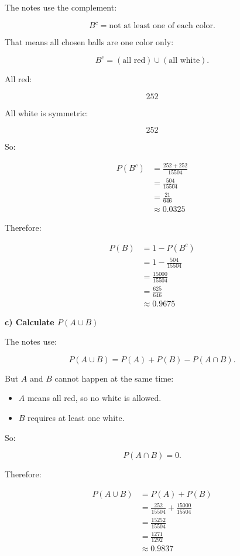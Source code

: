 \documentclass[10pt]{article}
\begin{document}
The notes use the complement:

\[
B^c=\text{not at least one of each color}.
\]

That means all chosen balls are one color only:

\[
B^c=(\text{all red})\cup(\text{all white}).
\]

All red:

\[
252
\]

All white is symmetric:

\[
252
\]

So:

\begin{align*}
P(B^c)
&=
\frac{252+252}{15504} \\[2mm]
&=
\frac{504}{15504} \\[2mm]
&=
\frac{21}{646} \\[2mm]
&\approx 0.0325
\end{align*}

Therefore:

\begin{align*}
P(B)
&=
1-P(B^c) \\[2mm]
&=
1-\frac{504}{15504} \\[2mm]
&=
\frac{15000}{15504} \\[2mm]
&=
\frac{625}{646} \\[2mm]
&\approx 0.9675
\end{align*}

\textbf{c) Calculate $P(A\cup B)$}

The notes use:

\[
P(A\cup B)
=P(A)+P(B)-P(A\cap B).
\]

But $A$ and $B$ cannot happen at the same time:

\begin{itemize}
\item $A$ means all red, so no white is allowed.
\item $B$ requires at least one white.
\end{itemize}

So:

\[
P(A\cap B)=0.
\]

Therefore:

\begin{align*}
P(A\cup B)
&=
P(A)+P(B) \\[2mm]
&=
\frac{252}{15504}
+\frac{15000}{15504} \\[2mm]
&=
\frac{15252}{15504} \\[2mm]
&=
\frac{1271}{1292} \\[2mm]
&\approx 0.9837
\end{align*}
\end{document}
